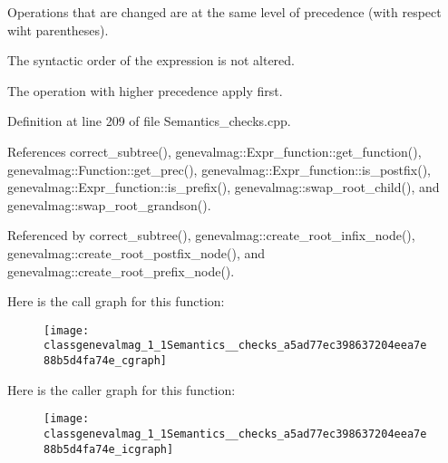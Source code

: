 \begin{DoxyItemize}
\item Operations that are changed are at the same level of precedence (with respect wiht parentheses).
\item The syntactic order of the expression is not altered.
\item The operation with higher precedence apply first. 
\end{DoxyItemize}

Definition at line 209 of file Semantics\_\-checks.cpp.



References correct\_\-subtree(), genevalmag::Expr\_\-function::get\_\-function(), genevalmag::Function::get\_\-prec(), genevalmag::Expr\_\-function::is\_\-postfix(), genevalmag::Expr\_\-function::is\_\-prefix(), genevalmag::swap\_\-root\_\-child(), and genevalmag::swap\_\-root\_\-grandson().



Referenced by correct\_\-subtree(), genevalmag::create\_\-root\_\-infix\_\-node(), genevalmag::create\_\-root\_\-postfix\_\-node(), and genevalmag::create\_\-root\_\-prefix\_\-node().



Here is the call graph for this function:\nopagebreak
\begin{figure}[H]
\begin{center}
\leavevmode
\texttt{[image: classgenevalmag\_1\_1Semantics\_\_checks\_a5ad77ec398637204eea7e88b5d4fa74e\_cgraph]}
\end{center}
\end{figure}




Here is the caller graph for this function:\nopagebreak
\begin{figure}[H]
\begin{center}
\leavevmode
\texttt{[image: classgenevalmag\_1\_1Semantics\_\_checks\_a5ad77ec398637204eea7e88b5d4fa74e\_icgraph]}
\end{center}
\end{figure}


